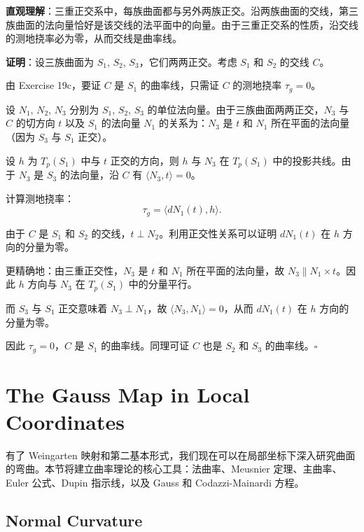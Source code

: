 \begin{solution}
\textbf{直观理解}：三重正交系中，每族曲面都与另外两族正交。沿两族曲面的交线，第三族曲面的法向量恰好是该交线的法平面中的向量。由于三重正交系的性质，沿交线的测地挠率必为零，从而交线是曲率线。

\textbf{证明}：设三族曲面为 $S_1$, $S_2$, $S_3$，它们两两正交。考虑 $S_1$ 和 $S_2$ 的交线 $C$。

由 Exercise 19c，要证 $C$ 是 $S_1$ 的曲率线，只需证 $C$ 的测地挠率 $\tau_g = 0$。

设 $N_1$, $N_2$, $N_3$ 分别为 $S_1$, $S_2$, $S_3$ 的单位法向量。由于三族曲面两两正交，$N_3$ 与 $C$ 的切方向 $t$ 以及 $S_1$ 的法向量 $N_1$ 的关系为：$N_3$ 是 $t$ 和 $N_1$ 所在平面的法向量（因为 $S_3$ 与 $S_1$ 正交）。

设 $h$ 为 $T_p(S_1)$ 中与 $t$ 正交的方向，则 $h$ 与 $N_3$ 在 $T_p(S_1)$ 中的投影共线。由于 $N_3$ 是 $S_3$ 的法向量，沿 $C$ 有 $\langle N_3, t \rangle = 0$。

计算测地挠率：
\[
\tau_g = \langle dN_1(t), h \rangle.
\]

由于 $C$ 是 $S_1$ 和 $S_2$ 的交线，$t \perp N_2$。利用正交性关系可以证明 $dN_1(t)$ 在 $h$ 方向的分量为零。

更精确地：由三重正交性，$N_3$ 是 $t$ 和 $N_1$ 所在平面的法向量，故 $N_3 \parallel N_1 \times t$。因此 $h$ 方向与 $N_3$ 在 $T_p(S_1)$ 中的分量平行。

而 $S_3$ 与 $S_1$ 正交意味着 $N_3 \perp N_1$，故 $\langle N_3, N_1 \rangle = 0$，从而 $dN_1(t)$ 在 $h$ 方向的分量为零。

因此 $\tau_g = 0$，$C$ 是 $S_1$ 的曲率线。同理可证 $C$ 也是 $S_2$ 和 $S_3$ 的曲率线。$\square$
\end{solution}

\section{The Gauss Map in Local Coordinates}\label{sec:gauss-map-local}

有了 Weingarten 映射和第二基本形式，我们现在可以在局部坐标下深入研究曲面的弯曲。本节将建立曲率理论的核心工具：法曲率、Meusnier 定理、主曲率、Euler 公式、Dupin 指示线，以及 Gauss 和 Codazzi-Mainardi 方程。

\subsection{Normal Curvature}\label{sec:normal-curvature}

